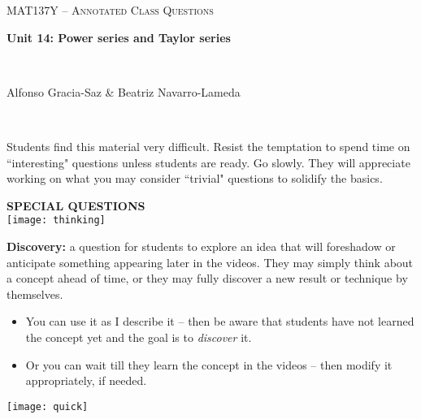\documentclass[11pt]{article}
\begin{document}
\thispagestyle{empty}
	\begin{center}
		{ {\LARGE  \scshape
		\textcolor{137cp3}{MAT137Y --   Annotated Class Questions}
		}
		
		\medskip
		{\bf \Large \textcolor{137cp1}{Unit 14: Power series and Taylor series
		}}
		
		\
		
		\medskip
		{\large
		\textcolor{137cp1}{Alfonso Gracia-Saz \& Beatriz Navarro-Lameda}
		}}
	\end{center}

\vspace{3mm}

\begin{warning}
\ \vspace{-3mm}

	Students find this material very difficult.  	
	Resist the temptation to spend time on ``interesting" questions unless students are ready.   Go slowly.  They will appreciate working on what you may consider ``trivial" questions to solidify the basics.
\end{warning}

\vspace{5mm}

{\bf SPECIAL QUESTIONS}\\


	\hspace{-1.3cm} {\texttt{[image: thinking]}}\\
	\vspace{-1.5cm}
	
	  {\bf Discovery: }  a question for students to explore an idea that will foreshadow or anticipate something appearing later in the videos.  They may simply think about a concept ahead of time, or they may fully discover a new result or technique by themselves.
		\begin{itemize}
			\item You can use it as I describe it -- then be aware that students have not learned the concept yet and the goal is to \emph{discover} it.
			\item Or you can wait till they learn the concept in the videos -- then modify it appropriately, if needed.	\\
		\end{itemize}

	\hspace{-1.3cm} {\texttt{[image: quick]}}\\
	\vspace{-1.5cm}	
	
\end{document}
